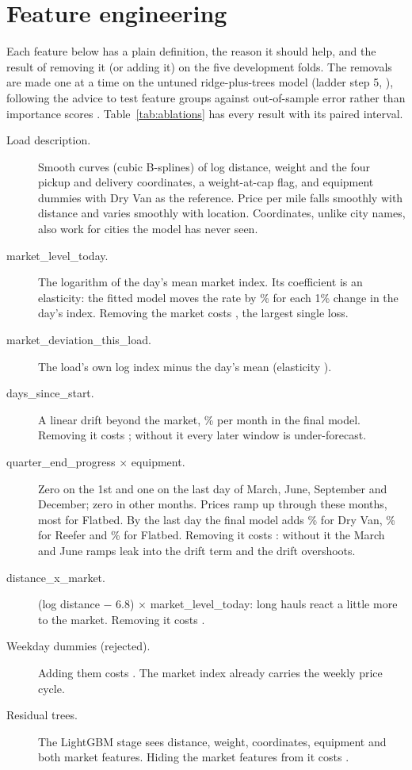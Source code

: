 \section{Feature engineering}\label{sec:features}

Each feature below has a plain definition, the reason it should help, and the result of removing it (or adding it)
on the five development folds. The removals are made one at a time on the untuned ridge-plus-trees model (ladder
step 5, \usd{\DevStepE}), following the advice to test feature groups against out-of-sample error rather than
importance scores \citep{kuhn2019feature}. Table~\ref{tab:ablations} has every result with its paired interval.

\begin{description}
  \item[Load description.] Smooth curves (cubic B-splines) of log distance, weight and the four pickup and delivery
    coordinates, a weight-at-cap flag, and equipment dummies with Dry Van as the reference. Price per mile falls
    smoothly with distance and varies smoothly with location. Coordinates, unlike city names, also work for cities
    the model has never seen.
  \item[market\_level\_today.] The logarithm of the day's mean market index. Its coefficient is an elasticity: the
    fitted model moves the rate by \ElasticityDay\% for each 1\% change in the day's index. Removing the market
    costs \usd{\AblNoMarket}, the largest single loss.
  \item[market\_deviation\_this\_load.] The load's own log index minus the day's mean (elasticity \ElasticityLoad).
  \item[days\_since\_start.] A linear drift beyond the market, \DriftPerMonth\% per month in the final model.
    Removing it costs \usd{\AblNoTrend}; without it every later window is under-forecast.
  \item[quarter\_end\_progress $\times$ equipment.] Zero on the 1st and one on the last day of March, June,
    September and December; zero in other months. Prices ramp up through these months, most for Flatbed. By the
    last day the final model adds \RampDryVan\% for Dry Van, \RampReefer\% for Reefer and \RampFlatbed\% for
    Flatbed. Removing it costs \usd{\AblNoQuarterEnd}: without it the March and June ramps leak into the drift term
    and the drift overshoots.
  \item[distance\_x\_market.] (log distance $-$ 6.8) $\times$ market\_level\_today: long hauls react a little more
    to the market. Removing it costs \usd{\AblNoDistanceXMarket}.
  \item[Weekday dummies (rejected).] Adding them costs \usd{\AblAddDayOfWeek}. The market index already carries
    the weekly price cycle.
  \item[Residual trees.] The LightGBM stage sees distance, weight, coordinates, equipment and both market features.
    Hiding the market features from it costs \usd{\AblResidualTreesWithoutMarket}.
\end{description}

